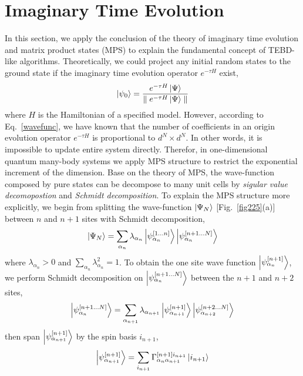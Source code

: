 \section{Imaginary Time Evolution}
\label{ite}
In this section, we apply the conclusion of the theory of imaginary time evolution and matrix product states (MPS) \cite{PhysRevB.73.094423} \cite{PhysRevLett.75.3537} to explain the fundamental concept of TEBD-like algorithms. Theoretically, we could project any initial random states to the ground state if the imaginary time evolution operator $e^{-\tau H}$ exist,  
\begin{align}
	\label{mapgroud}
	\Ket{\psi_0} = \frac{e^{-\tau H} \Ket{\Psi}}{\parallel e^{-\tau H} \Ket{\Psi}\parallel}
\end{align}
where $H$ is the Hamiltonian of a specified model. However, according to Eq.~\ref{wavefunc}, we have known that the number of coefficients in an origin evolution operator $e^{-\tau H}$ is proportional to $d^N \times d^N$. In other words, it is impossible to update entire system directly. Therefor, in one-dimensional quantum many-body systems we apply MPS structure to restrict the exponential increment of the dimension. Base on the theory of MPS, the wave-function composed by pure states can be decompose to many unit cells by \textit{sigular value decomopostion} and \textit{Schmidt decomposition}. To explain the MPS structure more explicitly, we begin from splitting the wave-function $\Ket{\Psi_N}$ [Fig.~\ref{fig225}(a)] between $n$ and $n+1$ sites with Schmidt decomposition, 
\begin{align}
	\label{schmitwave}
	\Ket{\Psi_{N}} = \sum_{\alpha_n} \lambda_{\alpha_n} \Ket{\psi_{\alpha_n}^{[1\dots n]}} \Ket{\psi_{\alpha_n}^{[n+1\dots N]}}
\end{align}
where $\lambda_{\alpha_n} > 0$ and $\sum\limits_{\alpha_n}{\lambda_{\alpha_n}^2 = 1}$. To obtain the one site wave function $\Ket{\psi_{\alpha_n}^{[n+1]}}$, we perform Schmidt decomposition on $\Ket{\psi_{\alpha_n}^{[n+1\dots N]}}$ between the $n+1$ and $n+2$ sites,
\begin{align}
	\Ket{\psi_{\alpha_n}^{[n+1\dots N]}} = \sum_{\alpha_{n+1}} \lambda_{\alpha_{n+1}} \Ket{\psi_{\alpha_{n+1}}^{[n+1]}} \Ket{\psi_{\alpha_{n+2}}^{[n+2\dots N]}}
\end{align}
then span $\Ket{\psi_{\alpha_{n+1}}^{[n+1]}}$ by the spin basis $i_{n+1}$,
\begin{align}
	\Ket{\psi_{\alpha_{n+1}}^{[n+1]}} = \sum_{i_{n+1}}{\Gamma^{[n+1] i_{n+1}}_{\alpha_n \alpha_{n+1}} \Ket{i_{n+1}}}
\end{align}

